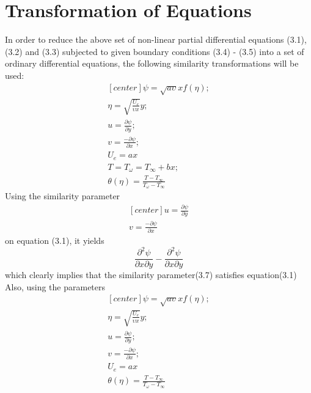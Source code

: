 \documentclass[a4paper,12pt]{report}
\begin{document}
{\section{Transformation of Equations}
In order to reduce the above set of non-linear partial differential equations (3.1),(3.2) and (3.3) subjected to given boundary conditions (3.4) - (3.5) into a set of ordinary differential equations, the following similarity transformations will be used:
\begin{equation}
	\begin{aligned}[center]
		\psi = \sqrt{a\upsilon}xf(\eta);\\
		\eta = \sqrt{\frac{U_e}{\upsilon x}}y;\\
		u = \frac{\partial\psi}{\partial y};\\
		v = \frac{-\partial\psi}{\partial x};\\
		U_e = ax\\
		T = T_\omega = T_\infty + bx;\\
		\theta(\eta) = \frac{T - T_\infty}{T_\omega - T_\infty}
	\end{aligned}
\end{equation}
Using the similarity parameter
\begin{equation}
	\begin{aligned}[center]
		u = \frac{\partial\psi}{\partial y}\\
		v=\frac{-\partial\psi}{\partial x}
	\end{aligned}
\end{equation}
on equation (3.1), it yields
\begin{equation}
	\frac{\partial^2\psi}{\partial x\partial y} - \frac{\partial^2\psi}{\partial x\partial y}
\end{equation}
which clearly implies that the similarity parameter(3.7) satisfies equation(3.1)\\
Also, using the parameters
\begin{equation}
	\begin{aligned}[center]
		\psi = \sqrt{a\upsilon}xf(\eta);\\
		\eta = \sqrt{\frac{U_e}{\upsilon x}}y;\\
		u = \frac{\partial\psi}{\partial y};\\
		v = \frac{-\partial\psi}{\partial x};\\
		U_e = ax\\
		\theta(\eta) = \frac{T - T_\infty}{T_\omega - T_\infty}
	\end{aligned}
\end{equation}
}
\end{document}

